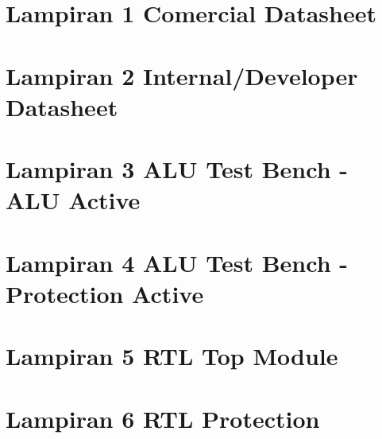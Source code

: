 % 


\chapter*{Lampiran 1 Comercial Datasheet}

\chapter*{Lampiran 2 Internal/Developer Datasheet}


\chapter*{Lampiran 3 ALU Test Bench - ALU Active}


\chapter*{Lampiran 4 ALU Test Bench - Protection Active}



\chapter*{Lampiran 5 RTL Top Module}


\chapter*{Lampiran 6 RTL Protection}

